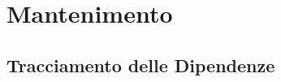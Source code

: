 \section{Mantenimento}
\label{sec:maintenance}

\subsection{Tracciamento delle Dipendenze}
\label{sec:tracciamento-dipendenze}
